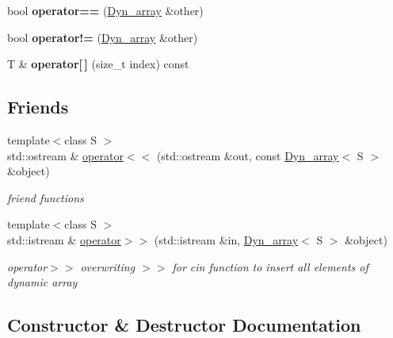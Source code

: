 \begin{DoxyCompactItemize}
\mbox{\label{classDyn__array_a28a167f80e6fc521b554d4593fb34fed}} 
bool {\bfseries operator==} (\hyperlink{classDyn__array}{Dyn\+\_\+array} \&other)
\item 
\mbox{\label{classDyn__array_aa8b85bba86c621693fab80fd9f8d18bc}} 
bool {\bfseries operator!=} (\hyperlink{classDyn__array}{Dyn\+\_\+array} \&other)
\item 
\mbox{\label{classDyn__array_ad0a2b07ac0796bec497173998c25a279}} 
T \& {\bfseries operator\mbox{[}$\,$\mbox{]}} (size\+\_\+t index) const
\end{DoxyCompactItemize}
\subsection*{Friends}
\begin{DoxyCompactItemize}
\item 
{\footnotesize template$<$class S $>$ }\\std\+::ostream \& \hyperlink{classDyn__array_aebc2873551e997f690220158398e5bf3}{operator$<$$<$} (std\+::ostream \&out, const \hyperlink{classDyn__array}{Dyn\+\_\+array}$<$ S $>$ \&object)
\begin{DoxyCompactList}\small\item\em friend functions \end{DoxyCompactList}\item 
{\footnotesize template$<$class S $>$ }\\std\+::istream \& \hyperlink{classDyn__array_a3b9156ade0a68fef20fc21e06aed9cc0}{operator$>$$>$} (std\+::istream \&in, \hyperlink{classDyn__array}{Dyn\+\_\+array}$<$ S $>$ \&object)
\begin{DoxyCompactList}\small\item\em operator$>$$>$ overwriting $>$$>$ for cin function to insert all elements of dynamic array \end{DoxyCompactList}\end{DoxyCompactItemize}


\subsection{Constructor \& Destructor Documentation}
\mbox{\label{classDyn__array_a3afc99260021fc0a0861c7a6dffa7dcb}} 
